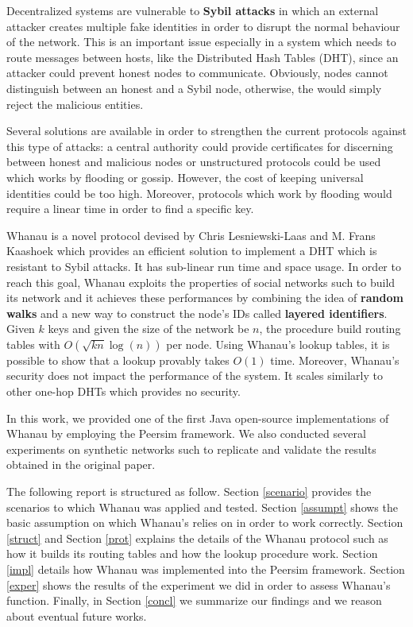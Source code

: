Decentralized systems are vulnerable to \textbf{Sybil attacks} in which an external attacker creates multiple fake identities in order to disrupt the normal behaviour of the network. This is an important issue especially in a system which needs to route messages between hosts, like the Distributed Hash Tables (DHT), since an attacker could prevent honest nodes to communicate.
Obviously, nodes cannot distinguish between an honest and a Sybil node, otherwise, the would simply reject the malicious entities.

Several solutions are available in order to strengthen the current protocols against this type of attacks: a central authority could provide certificates for discerning between honest and malicious nodes or unstructured protocols could be used which works by flooding or gossip. 
However, the cost of keeping universal identities could be too high. Moreover, protocols which work by flooding would require a linear time in order to find a specific key.

Whanau \cite{lesniewski2010whanau} is a novel protocol devised by Chris Lesniewski-Laas and M. Frans Kaashoek which provides an efficient solution to implement a DHT which is resistant to Sybil attacks. It has sub-linear run time and space usage. In order to reach this goal, Whanau exploits the properties of social networks such to build its network and it achieves these performances by combining the idea of \textbf{random walks} and a new way to construct the node's IDs called \textbf{layered identifiers}. Given $k$ keys and given the size of the network be $n$, the procedure build routing tables with $O(\sqrt{kn}\log(n))$ per node. Using Whanau's lookup tables, it is possible to show that a lookup provably takes $O(1)$ time. Moreover, Whanau's security does not impact the performance of the system. It scales similarly to other one-hop DHTs which provides no security.

In this work, we provided one of the first Java open-source implementations of Whanau by employing the Peersim \cite{montresor2009peersim} framework. We also conducted several experiments on synthetic networks such to replicate and validate the results obtained in the original paper. 

The following report is structured as follow. Section \ref{scenario} provides the scenarios to which Whanau was applied and tested. Section \ref{assumpt} shows the basic assumption on which Whanau's relies on in order to work correctly. 
Section \ref{struct} and Section \ref{prot} explains the details of the Whanau protocol such as how it builds its routing tables and how the lookup procedure work. Section \ref{impl} details how Whanau was implemented into the Peersim framework. Section \ref{exper} shows the results of the experiment we did in order to assess Whanau's function. Finally, in Section \ref{concl} we summarize our findings and we reason about eventual future works.

